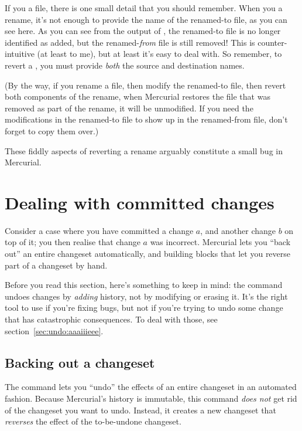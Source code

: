 If you  a file, there is one small detail that
you should remember.  When you  a rename, it's not
enough to provide the name of the renamed-to file, as you can see
here.
As you can see from the output of , the renamed-to file
is no longer identified as added, but the renamed-\emph{from} file is
still removed!  This is counter-intuitive (at least to me), but at
least it's easy to deal with.
So remember, to revert a , you must provide \emph{both}
the source and destination names.  

(By the way, if you rename a file, then modify the renamed-to file,
then revert both components of the rename, when Mercurial restores the
file that was removed as part of the rename, it will be unmodified.
If you need the modifications in the renamed-to file to show up in the
renamed-from file, don't forget to copy them over.)

These fiddly aspects of reverting a rename arguably constitute a small
bug in Mercurial.

\section{Dealing with committed changes}

Consider a case where you have committed a change $a$, and another
change $b$ on top of it; you then realise that change $a$ was
incorrect.  Mercurial lets you ``back out'' an entire changeset
automatically, and building blocks that let you reverse part of a
changeset by hand.

Before you read this section, here's something to keep in mind: the
 command undoes changes by \emph{adding} history, not
by modifying or erasing it.  It's the right tool to use if you're
fixing bugs, but not if you're trying to undo some change that has
catastrophic consequences.  To deal with those, see
section~\ref{sec:undo:aaaiiieee}.

\subsection{Backing out a changeset}

The  command lets you ``undo'' the effects of an entire
changeset in an automated fashion.  Because Mercurial's history is
immutable, this command \emph{does not} get rid of the changeset you
want to undo.  Instead, it creates a new changeset that
\emph{reverses} the effect of the to-be-undone changeset.

